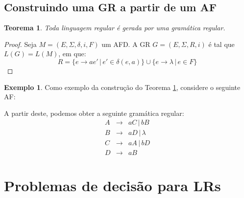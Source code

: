 \documentclass[a4paper]{article}
\newtheorem{Theorem}{Teorema}
\theoremstyle{definition}
\newtheorem{Example}{Exemplo}
\begin{document}
  \subsection{Construindo uma GR a partir de um AF}

  \begin{Theorem}\label{teorema2}
    Toda linguagem regular é gerada por uma gramática regular.
  \end{Theorem}
  \begin{proof}
    Seja $M = (E,\Sigma,\delta,i,F)$ um AFD. A GR $G = (E,\Sigma, R, i)$ é tal
    que $L(G) = L(M)$, em que:
    \[
      R = \{e \to ae' \,|\,e'\in\delta(e,a)\} \cup \{e \to \lambda\,|\,e \in F\}
    \]
  \end{proof}

  \begin{Example}
    Como exemplo da construção do Teorema \ref{teorema2}, considere o seguinte
    AF:
    \begin{figure}[H]
      \centering
    \end{figure}
    A partir deste, podemos obter a seguinte gramática regular:
    \[
      \begin{array}{lcl}
        A & \to & aC \,|\, bB \\
        B & \to & aD \,|\, \lambda\\
        C & \to & aA \,|\, bD \\
        D & \to & aB
      \end{array}
    \]
  \end{Example}
  

  \section{Problemas de decisão para LRs}
\end{document}
